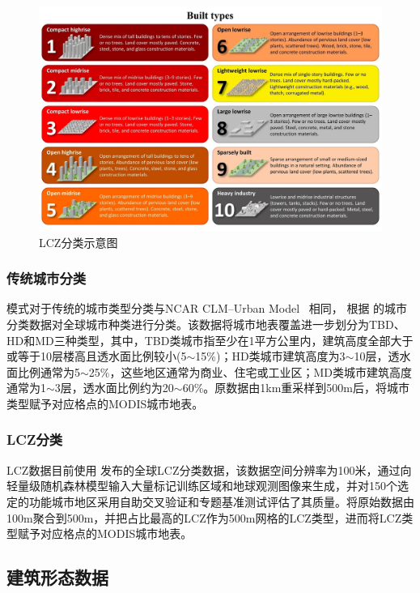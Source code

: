 {
\begin{figure}[htbp]
\centering
\includegraphics[width=\textwidth]{Figures/基础数据/LCZ分类图示.jpg}
\caption{LCZ分类示意图~\citep{demuzere2020combining,stewart2012local}}
\label{fig:LCZ分类图示}
\end{figure}
}

\subsubsection{传统城市分类}\label{传统城市分类}
模式对于传统的城市类型分类与NCAR CLM--Urban Model~\citep{oleson2020parameterization} 相同，
根据 \citet{jackson2010parameterization} 的城市分类数据对全球城市种类进行分类。该数据将城市地表覆盖进一步划分为TBD、HD和MD三种类型，其中，TBD类城市指至少在1平方公里内，建筑高度全部大于或等于10层楼高且透水面比例较小(5$\sim$15\%)；HD类城市建筑高度为3$\sim$10层，透水面比例通常为5$\sim$25\%，这些地区通常为商业、住宅或工业区；MD类城市建筑高度通常为1$\sim$3层，透水面比例约为20$\sim$60\%。原数据由1km重采样到500m后，将城市类型赋予对应格点的MODIS城市地表。
\subsubsection{LCZ分类}\label{LCZ分类}
LCZ数据目前使用 \citet{demuzere2022global} 发布的全球LCZ分类数据，该数据空间分辨率为100米，通过向轻量级随机森林模型输入大量标记训练区域和地球观测图像来生成，并对150个选定的功能城市地区采用自助交叉验证和专题基准测试评估了其质量。将原始数据由100m聚合到500m，并把占比最高的LCZ作为500m网格的LCZ类型，进而将LCZ类型赋予对应格点的MODIS城市地表。


\subsection{建筑形态数据}\label{建筑形态数据}
